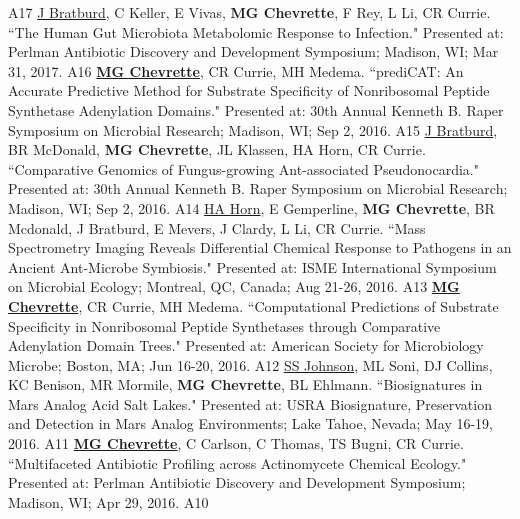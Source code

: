 \begin{cvpubs}
    {A17} %
  \cvpub
    {\underline{J Bratburd}, C Keller, E Vivas, \textbf{MG Chevrette}, F Rey, L Li, CR Currie. ``The Human Gut Microbiota Metabolomic Response to Infection." Presented at: Perlman Antibiotic Discovery and Development Symposium; Madison, WI; Mar 31, 2017.} %
    {A16} %
  \cvpub
    {\textbf{\underline{MG Chevrette}}, CR Currie, MH Medema.  ``prediCAT: An Accurate Predictive Method for Substrate Specificity of Nonribosomal Peptide Synthetase Adenylation Domains." Presented at: 30th Annual Kenneth B. Raper Symposium on Microbial Research; Madison, WI; Sep 2, 2016.} %
    {A15} %
  \cvpub
    {\underline{J Bratburd}, BR McDonald, \textbf{MG Chevrette}, JL Klassen, HA Horn, CR Currie. ``Comparative Genomics of Fungus-growing Ant-associated Pseudonocardia." Presented at: 30th Annual Kenneth B. Raper Symposium on Microbial Research; Madison, WI; Sep 2, 2016.} %
    {A14} %
  \cvpub
    {\underline{HA Horn}, E Gemperline, \textbf{MG Chevrette}, BR Mcdonald, J Bratburd, E Mevers, J Clardy, L Li, CR Currie. ``Mass Spectrometry Imaging Reveals Differential Chemical Response to Pathogens in an Ancient Ant-Microbe Symbiosis." Presented at: ISME International Symposium on Microbial Ecology; Montreal, QC, Canada; Aug 21-26, 2016.} %
    {A13} %
  \cvpub
    {\textbf{\underline{MG Chevrette}}, CR Currie, MH Medema.  ``Computational Predictions of Substrate Specificity in Nonribosomal Peptide Synthetases through Comparative Adenylation Domain Trees." Presented at: American Society for Microbiology Microbe; Boston, MA; Jun 16-20, 2016.} %
    {A12} %
  \cvpub
    {\underline{SS Johnson}, ML Soni, DJ Collins, KC Benison, MR Mormile, \textbf{MG Chevrette}, BL Ehlmann. ``Biosignatures in Mars Analog Acid Salt Lakes." Presented at: USRA Biosignature, Preservation and Detection in Mars Analog Environments; Lake Tahoe, Nevada; May 16-19, 2016.} %
    {A11} %
  \cvpub
    {\textbf{\underline{MG Chevrette}}, C Carlson, C Thomas, TS Bugni, CR Currie. ``Multifaceted Antibiotic Profiling across Actinomycete Chemical Ecology." Presented at: Perlman Antibiotic Discovery and Development Symposium; Madison, WI; Apr 29, 2016.} %
    {A10} %
\end{cvpubs}
